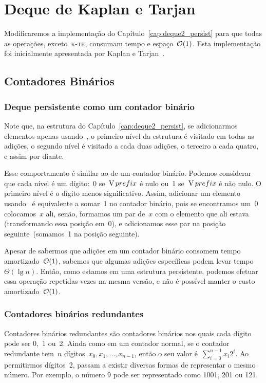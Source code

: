 \documentclass[main.tex]{subfiles}
\begin{document}
\chapter{Deque de Kaplan e Tarjan} \label{cap:deque3_persist}

Modificaremos a implementação do Capítulo~\ref{cap:deque2_persist} para que todas as operações, exceto~\textsc{k-th}, consumam tempo e espaço~$\mathcal{O}(1)$. Esta implementação foi inicialmente apresentada por Kaplan e Tarjan~\cite{KaplanT1999}.

\section{Contadores Binários} \label{sec:contbin}

\subsection{Deque persistente como um contador binário}

Note que, na estrutura do Capítulo~\ref{cap:deque2_persist}, se adicionarmos elementos apenas usando~, o primeiro nível da estrutura é visitado em todas as adições, o segundo nível é visitado a cada duas adições, o terceiro a cada quatro, e assim por diante.

Esse comportamento é similar ao de um contador binário. Podemos considerar que cada nível é um dígito:~0 se~$\operatorname{V}{prefix}$ é nulo ou~1 se~$\operatorname{V}{prefix}$ é não nulo. O primeiro nível é o dígito menos significativo. Assim, adicionar um elemento usando~ é equivalente a somar~1 no contador binário, pois se encontramos um~0 colocamos~$x$ ali, senão, formamos um par de~$x$ com o elemento que ali estava (transformando essa posição em~0), e adicionamos esse par na posição seguinte~(somamos~1 na posição seguinte).

Apesar de sabermos que adições em um contador binário consomem tempo amortizado~$\mathcal{O}(1)$, sabemos que algumas adições específicas podem levar tempo~$\Theta(\lg n)$. Então, como estamos em uma estrutura persistente, podemos efetuar essa operação repetidas vezes na mesma versão, e não é possível manter o custo amortizado~$\mathcal{O}(1)$.

\subsection{Contadores binários redundantes}

Contadores binários redundantes são contadores binários nos quais cada dígito pode ser 0,~1 ou~2. Ainda como em um contador normal, se o contador redundante tem~$n$ dígitos~$x_0, x_1, \ldots, x_{n-1}$, então o seu valor é~$\sum\limits_{i=0}^{n-1}{x_i 2^i}$. Ao permitirmos dígitos~2, passam a existir diversas formas de representar o mesmo número. Por exemplo, o número 9 pode ser representado como 1001, 201 ou 121.
\end{document}
